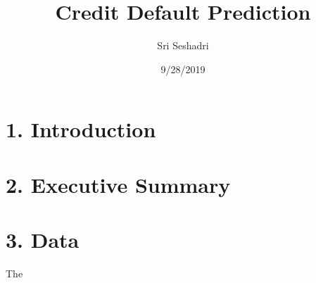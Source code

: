 \documentclass[]{article}
\title{Credit Default Prediction}
\author{Sri Seshadri}
\date{9/28/2019}
\begin{document}
\maketitle

\hypertarget{introduction}{%
\section{1. Introduction}\label{introduction}}

\hypertarget{executive-summary}{%
\section{2. Executive Summary}\label{executive-summary}}

\hypertarget{data}{%
\section{3. Data}\label{data}}

The
\end{document}
